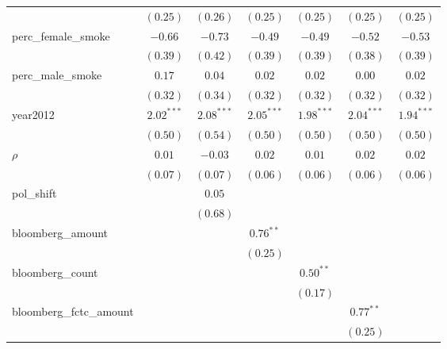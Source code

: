 \begin{table}[!h]
\begin{center}
\begin{tabular}{l c c c c c c }
                        & $(0.25)$     & $(0.26)$     & $(0.25)$     & $(0.25)$     & $(0.25)$     & $(0.25)$     \\
perc\_female\_smoke     & $-0.66$      & $-0.73$      & $-0.49$      & $-0.49$      & $-0.52$      & $-0.53$      \\
                        & $(0.39)$     & $(0.42)$     & $(0.39)$     & $(0.39)$     & $(0.38)$     & $(0.39)$     \\
perc\_male\_smoke       & $0.17$       & $0.04$       & $0.02$       & $0.02$       & $0.00$       & $0.02$       \\
                        & $(0.32)$     & $(0.34)$     & $(0.32)$     & $(0.32)$     & $(0.32)$     & $(0.32)$     \\
year2012                & $2.02^{***}$ & $2.08^{***}$ & $2.05^{***}$ & $1.98^{***}$ & $2.04^{***}$ & $1.94^{***}$ \\
                        & $(0.50)$     & $(0.54)$     & $(0.50)$     & $(0.50)$     & $(0.50)$     & $(0.50)$     \\
$\rho$                  & $0.01$       & $-0.03$      & $0.02$       & $0.01$       & $0.02$       & $0.02$       \\
                        & $(0.07)$     & $(0.07)$     & $(0.06)$     & $(0.06)$     & $(0.06)$     & $(0.06)$     \\
pol\_shift              &              & $0.05$       &              &              &              &              \\
                        &              & $(0.68)$     &              &              &              &              \\
bloomberg\_amount       &              &              & $0.76^{**}$  &              &              &              \\
                        &              &              & $(0.25)$     &              &              &              \\
bloomberg\_count        &              &              &              & $0.50^{**}$  &              &              \\
                        &              &              &              & $(0.17)$     &              &              \\
bloomberg\_fctc\_amount &              &              &              &              & $0.77^{**}$  &              \\
                        &              &              &              &              & $(0.25)$     &              \\

\end{tabular}
\end{center}
\end{table}
